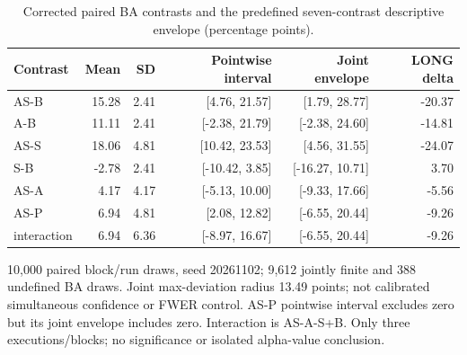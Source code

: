 \begin{table}[htbp]
\centering\small
\caption{Corrected paired BA contrasts and the predefined seven-contrast descriptive envelope (percentage points).}
\label{tab:r4_value_contrasts}
\setlength{\tabcolsep}{3.5pt}
\begin{tabular}{lrrrrr}
\hline
Contrast & Mean & SD & Pointwise interval & Joint envelope & LONG delta \\
\hline
AS-B & 15.28 & 2.41 & [4.76, 21.57] & [1.79, 28.77] & -20.37 \\
A-B & 11.11 & 2.41 & [-2.38, 21.79] & [-2.38, 24.60] & -14.81 \\
AS-S & 18.06 & 4.81 & [10.42, 23.53] & [4.56, 31.55] & -24.07 \\
S-B & -2.78 & 2.41 & [-10.42, 3.85] & [-16.27, 10.71] & 3.70 \\
AS-A & 4.17 & 4.17 & [-5.13, 10.00] & [-9.33, 17.66] & -5.56 \\
AS-P & 6.94 & 4.81 & [2.08, 12.82] & [-6.55, 20.44] & -9.26 \\
interaction & 6.94 & 6.36 & [-8.97, 16.67] & [-6.55, 20.44] & -9.26 \\
\hline
\end{tabular}
\par\smallskip\footnotesize 10,000 paired block/run draws, seed 20261102; 9,612 jointly finite and 388 undefined BA draws. Joint max-deviation radius 13.49 points; not calibrated simultaneous confidence or FWER control. AS-P pointwise interval excludes zero but its joint envelope includes zero. Interaction is AS-A-S+B. Only three executions/blocks; no significance or isolated alpha-value conclusion.
\end{table}

